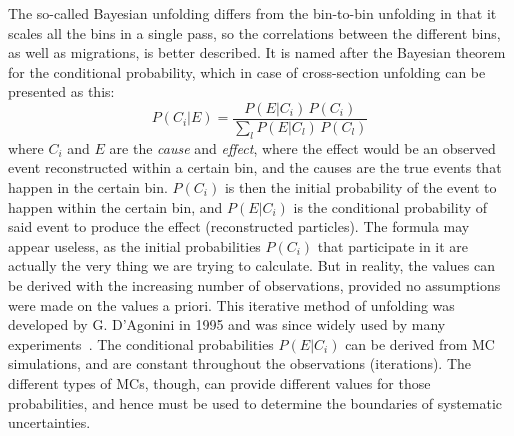 The so-called Bayesian unfolding differs from the bin-to-bin unfolding in that it scales all the bins in a single pass, so the correlations between the different bins, as well as migrations, is better described. It is named after the Bayesian theorem for the conditional probability, which in case of cross-section unfolding can be presented as this:
\begin{equation}
P(C_i|E) = \frac{P(E|C_i) \, P(C_i)}{\sum\limits_l P(E|C_l) \, P(C_l)}
\end{equation}
where $C_i$ and $E$ are the {\itshape cause} and {\itshape effect}, where the effect would be an observed event reconstructed within a certain bin, and the causes are the true events that happen in the certain bin. $P(C_i)$ is then the initial probability of the event to happen within the certain bin, and $P(E|C_i)$ is the conditional probability of said event to produce the effect (reconstructed particles). The formula may appear useless, as the initial probabilities $P(C_i)$ that participate in it are actually the very thing we are trying to calculate. But in reality, the values can be derived with the increasing number of observations, provided no assumptions were made on the values a priori. This iterative method of unfolding was developed by G. D'Agonini in 1995 and was since widely used by many experiments~\cite{lib:zcs_bayes}. The conditional probabilities $P(E|C_i)$ can be derived from MC simulations, and are constant throughout the observations (iterations). The different types of MCs, though, can provide different values for those probabilities, and hence must be used to determine the boundaries of systematic uncertainties.


